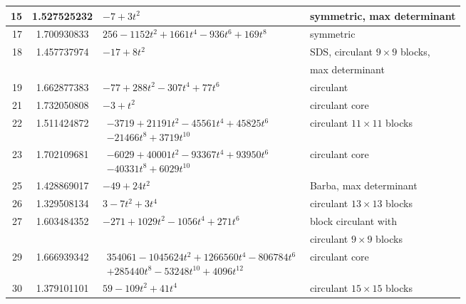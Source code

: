 \documentclass[11pt]{article}
\theoremstyle{plain}
\theoremstyle{definition}
\begin{document}
\begin{table}
\begin{tabular}{r c l l}
15 & 1.527525232 & $-7+3t^{2}$ & symmetric, max determinant \\[3pt]
\midrule

17 & 1.700930833 &
\footnotesize{$256 - 1152 t^{2} + 1661 t^{4} - 936 t^{6} + 169 t^{8}$}
& symmetric \\[3pt]
\midrule

\rowcolor{evenrow}
18 & 1.457737974 & $-17+8t^{2}$ & SDS, circulant $9\times9$ blocks, \\[-3pt]
\rowcolor{evenrow}
   &             &             & max determinant \\[3pt]
\midrule

19 & 1.662877383 &
$-77 + 288 t^{2} - 307 t^{4} + 77 t^{6}$ & circulant \\[3pt]
\midrule

21 & 1.732050808 & $-3+t^{2}$ & circulant core \\[3pt]
\midrule

\rowcolor{evenrow}
22 & 1.511424872 &
\footnotesize{$\begin{aligned}
-3719 + 21191 t^{2} - 45561 t^{4} + 45825 t^{6}\\[-3pt]
 -21466 t^{8} + 3719 t^{10}
\end{aligned}$}
& circulant $11\times11$ blocks \\[3pt]
\midrule

23 & 1.702109681 &
\footnotesize{$\begin{aligned}
-6029 + 40001 t^{2} - 93367 t^{4} + 93950 t^{6}\\[-3pt]
 -40331 t^{8} + 6029 t^{10}
\end{aligned}$}
& circulant core \\[3pt]
\midrule

25 & 1.428869017 & $-49 + 24t^{2}$ & Barba, max determinant \\[3pt]
\midrule

\rowcolor{evenrow}
26 & 1.329508134 & $3 - 7t^{2} + 3t^{4}$ & circulant $13\times13$ blocks \\[3pt]
\midrule

27 & 1.603484352 &
$-271 + 1029 t^{2} - 1056 t^{4} + 271 t^{6}$
& block circulant with \\[-3pt]
& & & circulant $9\times9$ blocks \\[3pt]
\midrule

29 & 1.666939342 &
\footnotesize{$\begin{aligned}
354061 - 1045624 t^{2} + 1266560 t^{4} - 806784 t^{6}\\[-3pt]
 + 285440 t^{8} - 53248 t^{10} + 4096 t^{12}
\end{aligned}$}
& circulant core \\[3pt]
\midrule

\rowcolor{evenrow}
30 & 1.379101101 & $59 - 109t^{2} + 41t^{4}$ & circulant $15\times15$ blocks \\[3pt]
\bottomrule
\end{tabular}
\end{table}
\end{document}
